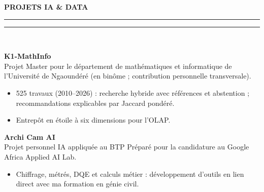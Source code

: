 \documentclass[10pt,a4paper]{article}
\newcommand{\mainSecTitle}[1]{%
  \vspace{11pt}%
  {\fontsize{11.0}{13.0}\selectfont\textbf{\color{sectionNavy}\MakeUppercase{#1}}}\\[2.5pt]%
  {\color{accentTeal}\rule{19mm}{1.2pt}\color{subtleRule}\rule{\dimexpr\linewidth-19mm\relax}{0.6pt}}\\[6pt]%
}
\begin{document}
\begin{minipage}[t]{0.648\textwidth}
  \vspace{3pt}
  \mainSecTitle{Projets IA \& Data}
  \begin{tcolorbox}[enhanced, frame hidden, interior hidden,
    borderline west={1.8pt}{0pt}{accentTeal},
    left=8pt, right=0pt, top=1.5pt, bottom=1.5pt, boxsep=0pt]
    \raggedright
    {\fontsize{11.2}{13.4}\selectfont\textbf{\color{primaryDark}K1-MathInfo}}\\[2pt]
    {\fontsize{9.1}{12.1}\selectfont\color{mutedSlate}Projet Master pour le département de mathématiques et informatique de l’Université de Ngaoundéré (en binôme ; contribution personnelle transversale).}\\[3pt]
    \begin{itemize}[leftmargin=10pt,label={\color{accentTeal}\tiny$\blacksquare$},itemsep=3.2pt,topsep=1.5pt,parsep=0pt]
    \item {\fontsize{9.9}{13.5}\selectfont\color{bodyText}525 travaux (2010--2026) : recherche hybride avec références et abstention ; recommandations explicables par Jaccard pondéré.}
    \item {\fontsize{9.9}{13.5}\selectfont\color{bodyText}Entrepôt en étoile à six dimensions pour l’OLAP.}
    \end{itemize}
  \end{tcolorbox}
\vspace{10pt}
  \begin{tcolorbox}[enhanced, frame hidden, interior hidden,
    borderline west={1.0pt}{0pt}{subtleRule},
    left=8pt, right=0pt, top=1.5pt, bottom=1.5pt, boxsep=0pt]
    \raggedright
    {\fontsize{11.2}{13.4}\selectfont\textbf{\color{primaryDark}Archi Cam AI}}\\[2pt]
    {\fontsize{9.1}{12.1}\selectfont\color{mutedSlate}Projet personnel \textperiodcentered{} IA appliquée au BTP \textperiodcentered{} Préparé pour la candidature au Google Africa Applied AI Lab.}\\[3pt]
    \begin{itemize}[leftmargin=10pt,label={\color{accentTeal}\tiny$\blacksquare$},itemsep=3.2pt,topsep=1.5pt,parsep=0pt]
    \item {\fontsize{9.9}{13.5}\selectfont\color{bodyText}Chiffrage, métrés, DQE et calculs métier : développement d’outils en lien direct avec ma formation en génie civil.}
    \end{itemize}
  \end{tcolorbox}
\vspace{10pt}
  \begin{tcolorbox}[enhanced, frame hidden, interior hidden,
    borderline west={1.0pt}{0pt}{subtleRule},
    left=8pt, right=0pt, top=1.5pt, bottom=1.5pt, boxsep=0pt]

\end{tcolorbox}
\end{minipage}
\end{document}
